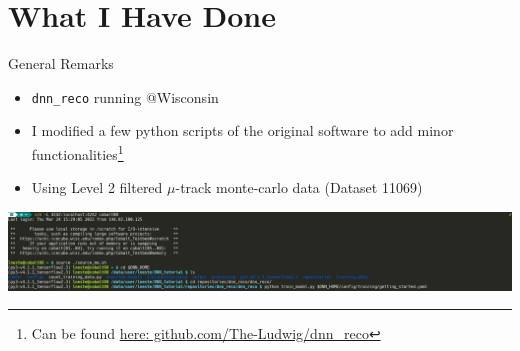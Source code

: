 \section{What I Have Done}
\begin{frame}{General Remarks}
    \begin{itemize}
        \item \texttt{dnn\_reco} running @Wisconsin
        \item I modified a few python scripts of the original software to add minor functionalities\footnote{Can be found \href{https://github.com/The-Ludwig/dnn_reco}{here: github.com/The-Ludwig/dnn\_reco} }
        \item Using Level 2 filtered $\mu$-track monte-carlo data (Dataset 11069)
    \end{itemize}
    \includegraphics[width=\textwidth]{media/console.png}
\end{frame}
